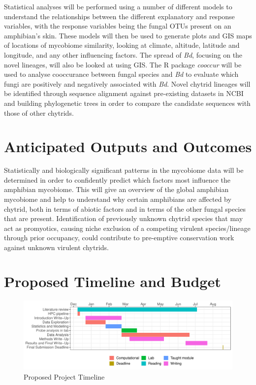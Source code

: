\documentclass[11pt, a4paper, titlepage]{article}
\begin{document}
\noindent Statistical analyses will be performed using a number of different models to understand the relationships between the different explanatory and response variables, with the response variables being the fungal OTUs present on an amphibian's skin. These models will then be used to generate plots and GIS maps of locations of mycobiome similarity, looking at climate, altitude, latitude and longitude, and any other influencing factors. The spread of \textit{Bd}, focusing on the novel lineages, will also be looked at using GIS. The R package \textit{cooccur} \parencite{RCooccur} will be used to analyse cooccurance between fungal species and \textit{Bd} to evaluate which fungi are positively and negatively associated with \textit{Bd}. Novel chytrid lineages will be identified through sequence alignment against pre-existing datasets in NCBI and building phylogenetic trees in order to compare the candidate sequences with those of other chytrids.

\section{Anticipated Outputs and Outcomes}

Statistically and biologically significant patterns in the mycobiome data will be determined in order to confidently predict which factors most influence the amphibian mycobiome. This will give an overview of the global amphibian mycobiome and help to understand why certain amphibians are affected by chytrid, both in terms of abiotic factors and in terms of the other fungal species that are present. Identification of previously unknown chytrid species that may act as promyotics, causing niche exclusion of a competing virulent species/lineage through prior occupancy, could contribute to pre-emptive conservation work against unknown virulent chytrids.

\section{Proposed Timeline and Budget}

\begin{figure}[h!]
	\centering\includegraphics[width=1\textwidth]{GanttChart.pdf}
	\caption{Proposed Project Timeline}
\end{figure}
\end{document}
